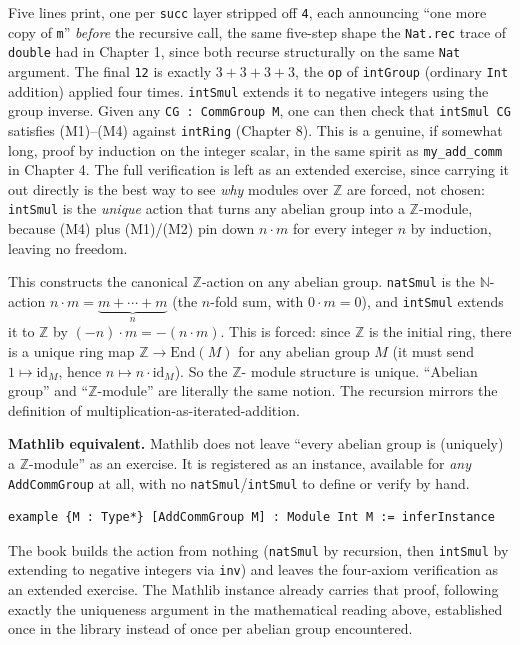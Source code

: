 Five lines print, one per \texttt{succ} layer stripped off \texttt{4}, each announcing ``one more copy of \texttt{m}'' \emph{before} the recursive call, the same five-step shape the \texttt{Nat.rec} trace of \texttt{double} had in Chapter 1, since both recurse structurally on the same \texttt{Nat} argument. The final \texttt{12} is exactly \(3+3+3+3\), the \texttt{op} of \texttt{intGroup} (ordinary \texttt{Int} addition) applied four times. \texttt{intSmul} extends it to negative integers using the group inverse. Given any \texttt{CG : CommGroup M}, one can then check that \texttt{intSmul CG} satisfies (M1)--(M4) against \texttt{intRing} (Chapter 8). This is a genuine, if somewhat long, proof by induction on the integer scalar, in the same spirit as \texttt{my\_\allowbreak{}add\_\allowbreak{}comm} in Chapter 4. The full verification is left as an extended exercise, since carrying it out directly is the best way to see \emph{why} modules over \(\mathbb{Z}\) are forced, not chosen: \texttt{intSmul} is the \emph{unique} action that turns any abelian group into a \(\mathbb{Z}\)-module, because (M4) plus (M1)/(M2) pin down \(n \cdot m\) for every integer \(n\) by induction, leaving no freedom.

\begin{mathreading}

This constructs the canonical \(\mathbb{Z}\)-action on any abelian group. \texttt{natSmul} is the \(\mathbb{N}\)-action \(n\cdot m = \underbrace{m + \cdots + m}_{n}\) (the \(n\)-fold sum, with \(0\cdot m = 0\)), and \texttt{intSmul} extends it to \(\mathbb{Z}\) by \((-n)\cdot m = -(n\cdot m)\). This is forced: since \(\mathbb{Z}\) is the initial ring, there is a unique ring map \(\mathbb{Z} \to \mathrm{End}(M)\) for any abelian group \(M\) (it must send \(1 \mapsto \mathrm{id}_M\), hence \(n \mapsto n\cdot\mathrm{id}_M\)). So the \(\mathbb{Z}\)- module structure is unique. ``Abelian group'' and ``\(\mathbb{Z}\)-module'' are literally the same notion. The recursion mirrors the definition of multiplication-as-iterated-addition.

\end{mathreading}

\textbf{Mathlib equivalent.} Mathlib does not leave ``every abelian group is (uniquely) a \(\mathbb{Z}\)-module'' as an exercise. It is registered as an instance, available for \emph{any} \texttt{AddCommGroup} at all, with no \texttt{natSmul}/\texttt{intSmul} to define or verify by hand.

\begin{lstlisting}
example {M : Type*} [AddCommGroup M] : Module Int M := inferInstance
\end{lstlisting}

The book builds the action from nothing (\texttt{natSmul} by recursion, then \texttt{intSmul} by extending to negative integers via \texttt{inv}) and leaves the four-axiom verification as an extended exercise. The Mathlib instance already carries that proof, following exactly the uniqueness argument in the mathematical reading above, established once in the library instead of once per abelian group encountered.
